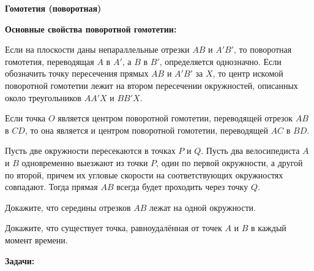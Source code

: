 \documentclass{article}
\begin{document}
    \large

    \begin{center}
        \textbf{Гомотетия (поворотная)}
    \end{center}

    \textbf{Основные свойства поворотной гомотетии:}

    \begin{enumerate_boxed}

        \item Если на плоскости даны непараллельные отрезки $AB$ и $A'B'$, то поворотная гомотетия, переводящая $A$ в $A'$, а $B$ в $B'$, определяется однозначно.
        Если обозначить точку пересечения прямых $AB$ и $A'B'$ за $X$, то центр искомой поворотной гомотетии лежит на втором пересечении окружностей, описанных около треугольников $AA'X$ и $BB'X$.

        \item Если точка $O$ является центром поворотной гомотетии, переводящей отрезок $AB$ в $CD$, то она является и центром поворотной гомотетии, переводящей $AC$ в $BD$.

        \item Пусть две окружности пересекаются в точках $P$ и $Q$.
        Пусть два велосипедиста $A$ и $B$ одновременно выезжают из точки $P$, один по первой окружности, а другой по второй, причем их угловые скорости на соответствующих окружностях совпадают.
        Тогда прямая $AB$ всегда будет проходить через точку $Q$.

        \item Докажите, что середины отрезков $AB$ лежат на одной окружности.

        \item Докажите, что существует точка, равноудалённая от точек $A$ и $B$ в каждый момент времени.

    \end{enumerate_boxed}

    \textbf{Задачи:}
\end{document}
